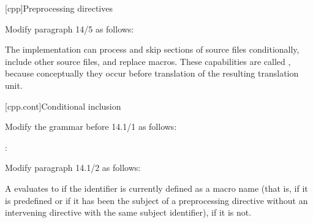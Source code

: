 \setcounter{chapter}{13}
[cpp]{Preprocessing directives}%

\begin{after}
Modify paragraph 14/5 as follows:

\begin{std.txt}
\resetalinea[4]
\alinea
The implementation can
process and skip sections of source files conditionally,
include other source files,
and replace macros.
These capabilities are called
,
because conceptually they occur
before translation of the resulting translation unit.
\end{std.txt}
\end{after}

\setcounter{section}{0}
[cpp.cont]{Conditional inclusion}%

Modify the grammar before 14.1/1 as follows:

\begin{std.txt}
\begin{bnf}
\br
  \br
\end{bnf}

\begin{bnf}
:\br
  \br
  \br
  \br
  \br
  \br
  \br
\end{bnf}
\end{std.txt}

Modify paragraph 14.1/2 as follows:

\begin{std.txt}
\resetalinea[1]
\alinea
A  evaluates to 
if the identifier is currently defined as a macro name
(that is, if it is predefined or if
it has been the subject of a  preprocessing directive
without an intervening  directive with the same subject
identifier),
 if it is not.

\end{std.txt}

